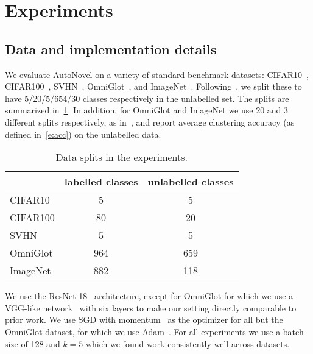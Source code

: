\section{Experiments}\label{sec:exp}

\subsection{Data and implementation details}\label{sec:exp:imp}

We evaluate AutoNovel on a variety of standard benchmark datasets:
CIFAR10~\cite{Krizhevsky09cifar}, CIFAR100~\cite{Krizhevsky09cifar}, SVHN~\cite{Netzer2011svhn}, OmniGlot~\cite{Lake15omnniglot}, and ImageNet~\cite{deng09imagnet}.  Following~\cite{han2019learning}, we split these to have
 5/20/5/654/30 classes respectively in the unlabelled set. The splits are summarized in~\cref{tab:datasplit}.
In addition, for OmniGlot and ImageNet we use 20 and 3 different splits respectively, as in~\cite{han2019learning}, and report average clustering accuracy (as defined in~\cref{e:acc}) on the unlabelled data.

\begin{table}[ht]
\centering
\footnotesize
\caption{Data splits in the experiments.}\label{tab:datasplit}
\begin{tabular}{lcc}
\toprule
& labelled classes & unlabelled classes \\
\midrule
CIFAR10 & 5 & 5 \\
CIFAR100 & 80 &  20 \\
SVHN & 5  & 5 \\
OmniGlot & 964  & 659 \\
ImageNet & 882 & 118 \\
\bottomrule
\end{tabular}
\end{table}




We use the ResNet-18~\cite{he2016deep} architecture, except for OmniGlot for which we use a VGG-like network~\cite{simonyan15vgg} with six layers to make our setting directly comparable to prior work.
We use SGD with momentum~\cite{sutskever2013importance} as the optimizer for all but the OmniGlot dataset, for which we use Adam~\cite{kingma2014adam}.
For all experiments we use a batch size of 128 and $k=5$ which we found work consistently well across datasets.

